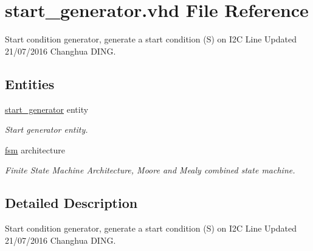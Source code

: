 \hypertarget{start__generator_8vhd}{}\section{start\+\_\+generator.\+vhd File Reference}
\label{start__generator_8vhd}


Start condition generator, generate a start condition (S) on I2C Line Updated 21/07/2016 Changhua D\+I\+NG.  


\subsection*{Entities}
\begin{DoxyCompactItemize}
\item 
\hyperlink{classstart__generator}{start\+\_\+generator} entity
\begin{DoxyCompactList}\small\item\em Start generator entity. \end{DoxyCompactList}\item 
\hyperlink{classstart__generator_1_1fsm}{fsm} architecture
\begin{DoxyCompactList}\small\item\em Finite State Machine Architecture, Moore and Mealy combined state machine. \end{DoxyCompactList}\end{DoxyCompactItemize}


\subsection{Detailed Description}
Start condition generator, generate a start condition (S) on I2C Line Updated 21/07/2016 Changhua D\+I\+NG. 

